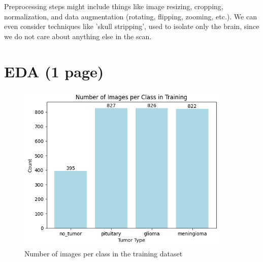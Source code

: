 \documentclass[conference]{IEEEtran}
\begin{document}
Preprocessing steps might include things like image resizing, cropping, normalization, and data augmentation (rotating, flipping, zooming, etc.). We can even consider techniques like 'skull stripping', used to isolate only the brain, since we do not care about anything else in the scan.


\section{\large EDA (1 page)}



\begin{figure}[!ht]
    \centering
    \includegraphics[width=4in]{ImagesPerClassTraining.png}
    \caption{\large Number of images per class in the training dataset}
    \label{Number of images per class in the training dataset}
\end{figure}
\end{document}
